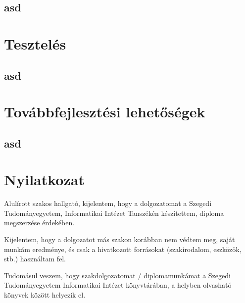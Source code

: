 \documentclass[12pt]{report}
\theoremstyle{definition}
\begin{document}
\section{asd}


\chapter{Tesztelés}
\section{asd}


\chapter{Továbbfejlesztési lehetőségek}
\section{asd}



\chapter*{Nyilatkozat}




\noindent
Alulírott \makebox[4cm]{\dotfill} szakos hallgató, kijelentem, hogy a dolgozatomat a Szegedi Tudományegyetem, Informatikai Intézet \makebox[4cm]{\dotfill} Tanszékén készítettem, \makebox[4cm]{\dotfill} diploma megszerzése érdekében.

Kijelentem, hogy a dolgozatot más szakon korábban nem védtem meg, saját munkám eredménye, és csak a hivatkozott forrásokat (szakirodalom, eszközök, stb.) használtam fel.

Tudomásul veszem, hogy szakdolgozatomat / diplomamunkámat a Szegedi Tudományegyetem Informatikai Intézet könyvtárában, a helyben olvasható könyvek között helyezik el.
\end{document}
